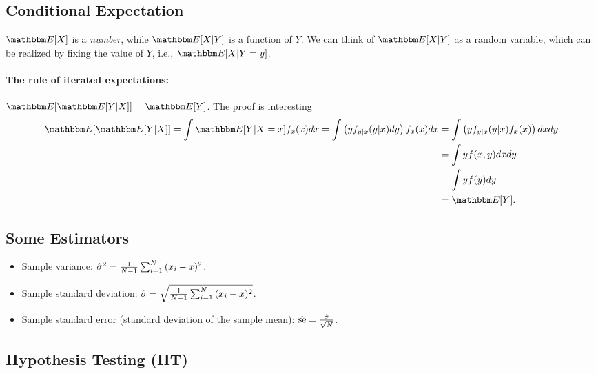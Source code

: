 \subsection{Conditional Expectation}
    $\E[X]$ is a \emph{number}, while $\E[X | Y]$ is a function of $Y$.
    We can think of $\E[X|Y]$ as a random variable, which can be realized by fixing the value of $Y$, i.e., $\E[X | Y=y]$.
    \paragraph{The rule of iterated expectations:} $\E[\E[Y | X]] = \E[Y]$.
    The proof is interesting
        \begin{equation}
            \begin{aligned}
                    \E[\E[Y|X]] = \int \E[Y|X=x] f_x(x) dx = \int \left(y f_{y|x}(y|x) dy\right) f_x(x) dx & = \int \left( y f_{y|x}(y|x) f_x(x)\right)dx dy \\
                    & = \int y f(x, y)  dx dy \\
                    & = \int y f(y) dy \\
                    & = \E[Y].
            \end{aligned}
        \end{equation}
    

    \subsection{Some Estimators}
        \begin{itemize}
            \item Sample variance: $\hat{\sigma}^2 = \frac{1}{N-1} \sum_{i=1}^{N}{(x_i - \bar{x})^2}$.
            \item Sample standard deviation: $\hat{\sigma} = \sqrt{\frac{1}{N-1} \sum_{i=1}^{N}{(x_i - \bar{x})^2}}$.
            \item Sample standard error (standard deviation of the sample mean): $\hat{\text{se}} = \frac{\hat{\sigma}}{\sqrt{N}}$.
        \end{itemize}
        

\subsection{Hypothesis Testing (HT)}

        
        
